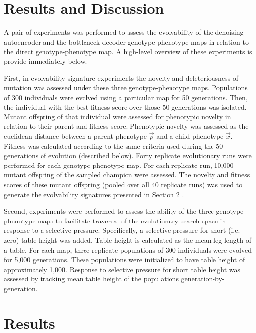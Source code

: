 \section{Results and Discussion}

A pair of experiments was performed to assess the evolvability of the denoising autoencoder and the bottleneck decoder genotype-phenotype maps in relation to the direct genotype-phenotype map.
A high-level overview of these experiments is provide immediately below.


First, in evolvability signature experiments the novelty and deleteriousness of mutation was assessed under these three genotype-phenotype maps.
Populations of 300 individuals were evolved using a particular map for 50 generations.
Then, the individual with the best fitness score over those 50 generations was isolated.
Mutant offspring of that individual were assessed for phenotypic novelty in relation to their parent and fitness score.
Phenotypic novelty was assessed as the euclidean distance between a parent phenotype $\vec{p}$ and a child phenotype $\vec{x}$.
Fitness was calculated according to the same criteria used during the 50 generations of evolution (described below).
Forty replicate evolutionary runs were performed for each genotype-phenotype map.
For each replicate run, 10,000 mutant offspring of the sampled champion were assessed.
The novelty and fitness scores of these mutant offspring (pooled over all 40 replicate runs) was used to generate the evolvability signatures presented in Section \ref{sec:results} \cite{tarapore2015evolvability}.

Second, experiments were performed to assess the ability of the three genotype-phenotype maps to facilitate traversal of the evolutionary search space in response to a selective pressure.
Specifically, a selective pressure for short (i.e. zero) table height was added.
Table height is calculated as the mean leg length of a table.
For each map, three replicate populations of 300 individuals were evolved for 5,000 generations.
These populations were initialized to have table height of approximately 1,000.
Response to selective pressure for short table height was assessed by tracking mean table height of the populations generation-by-generation.




\section{Results} \label{sec:results}

